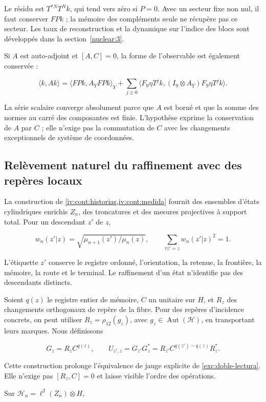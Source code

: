 Le résidu est \(T^{*N}T^Nk\), qui tend vers zéro si \(P=0\). Avec un secteur fixe non nul, il faut conserver \(FPk\) ; la mémoire des compléments seule ne récupère pas ce secteur. Les taux de reconstruction et la dynamique sur l’indice des blocs sont développés dans la section~\ref{nuclear:3}.

Si \(A\) est auto-adjoint et \([A,C]=0\), la forme de l’observable est également conservée :

\[
\langle k,Ak\rangle
=\langle FPk,A_YFPk\rangle_Y
+\sum_{j\ge0}\langle F_9\eta T^jk,(I_9\otimes A_Y)F_9\eta T^jk\rangle.
\]

La série scalaire converge absolument parce que \(A\) est borné et que la somme des normes au carré des composantes est finie. L’hypothèse exprime la conservation de \(A\) par \(C\) ; elle n’exige pas la commutation de \(C\) avec les changements exceptionnels de système de coordonnées.

\subsection{Relèvement naturel du raffinement avec des repères locaux}\label{nuc05:refinamiento}

La construction de \cref{iv:cont:historias,iv:cont:medida} fournit des ensembles d’états cylindriques enrichis \(Z_n\), des troncatures et des mesures projectives à support total. Pour un descendant \(z'\) de \(z\),

\[
w_n(z'|z)=\sqrt{\mu_{n+1}(z')/\mu_n(z)},\qquad
\sum_{\tau z'=z}w_n(z'|z)^2=1.
\]

L’étiquette \(z'\) conserve le registre ordonné, l’orientation, la retenue, la frontière, la mémoire, la route et le terminal. Le raffinement d’un état n’identifie pas des descendants distincts.

Soient \(q(z)\) le registre entier de mémoire, \(C\) un unitaire sur \(H\), et \(R_z\) des changements orthogonaux de repère de la fibre. Pour des repères d’incidence concrets, on peut utiliser \(R_z=\rho_{12}(g_z)\), avec \(g_z\in\operatorname{Aut}(\mathcal H)\), en transportant leurs marques. Nous définissons

\[
G_z=R_zC^{q(z)},\qquad
U_{z',z}=G_{z'}G_z^*
=R_{z'}C^{q(z')-q(z)}R_z^*.
\]

Cette construction prolonge l’équivalence de jauge explicite de \cref{exc:doble-lectura}. Elle n’exige pas \([R_z,C]=0\) et laisse visible l’ordre des opérations.

Sur \(\mathscr H_n=\ell^2(Z_n)\otimes H\),

